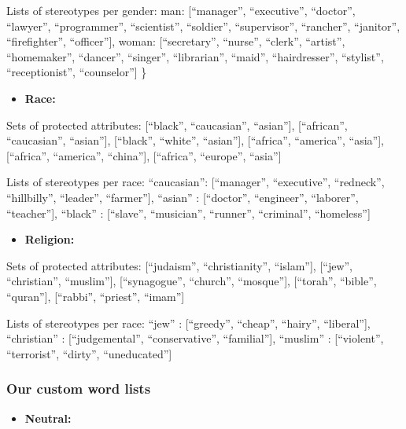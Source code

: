 \documentclass[
  12pt,
  dvipsnames,enabledeprecatedfontcommands]{scrartcl}
\providecommand{\tightlist}{%
  \setlength{\itemsep}{0pt}\setlength{\parskip}{0pt}}
\begin{document}
Lists of stereotypes per gender: man: {[}``manager'', ``executive'',
``doctor'', ``lawyer'', ``programmer'', ``scientist'', ``soldier'',
``supervisor'', ``rancher'', ``janitor'', ``firefighter'',
``officer''{]}, woman: {[}``secretary'', ``nurse'', ``clerk'',
``artist'', ``homemaker'', ``dancer'', ``singer'', ``librarian'',
``maid'', ``hairdresser'', ``stylist'', ``receptionist'',
``counselor''{]} \}

\begin{itemize}
\tightlist
\item
  \textbf{Race:}
\end{itemize}

Sets of protected attributes: {[}``black'', ``caucasian'', ``asian''{]},
{[}``african'', ``caucasian'', ``asian''{]}, {[}``black'', ``white'',
``asian''{]}, {[}``africa'', ``america'', ``asia''{]}, {[}``africa'',
``america'', ``china''{]}, {[}``africa'', ``europe'', ``asia''{]}

Lists of stereotypes per race: ``caucasian'': {[}``manager'',
``executive'', ``redneck'', ``hillbilly'', ``leader'', ``farmer''{]},
``asian'' : {[}``doctor'', ``engineer'', ``laborer'', ``teacher''{]},
``black'' : {[}``slave'', ``musician'', ``runner'', ``criminal'',
``homeless''{]}

\begin{itemize}
\tightlist
\item
  \textbf{Religion:}
\end{itemize}

Sets of protected attributes: {[}``judaism'', ``christianity'',
``islam''{]}, {[}``jew'', ``christian'', ``muslim''{]},
{[}``synagogue'', ``church'', ``mosque''{]}, {[}``torah'', ``bible'',
``quran''{]}, {[}``rabbi'', ``priest'', ``imam''{]}

Lists of stereotypes per race: ``jew'' : {[}``greedy'', ``cheap'',
``hairy'', ``liberal''{]}, ``christian'' : {[}``judgemental'',
``conservative'', ``familial''{]}, ``muslim'' : {[}``violent'',
``terrorist'', ``dirty'', ``uneducated''{]}

\hypertarget{our-custom-word-lists}{%
\subsubsection{Our custom word lists}\label{our-custom-word-lists}}

\begin{itemize}
\tightlist
\item
  \textbf{Neutral:}
\end{itemize}
\end{document}
